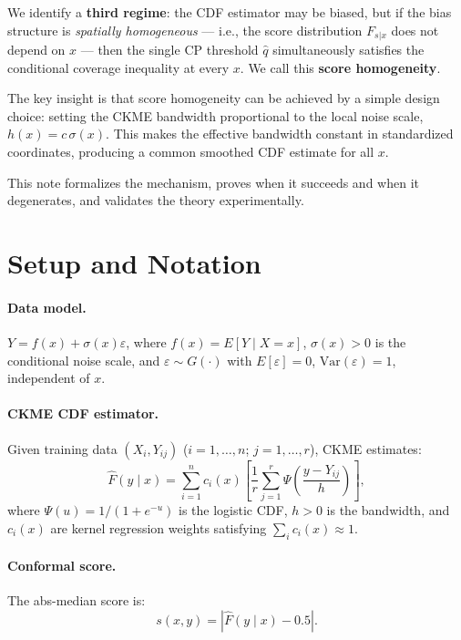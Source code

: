 \documentclass[11pt]{article}
\newif\ifpaper
\theoremstyle{remark}
\begin{document}
We identify a \textbf{third regime}: the CDF estimator may be biased,
but if the bias structure is \emph{spatially homogeneous} --- i.e., the
score distribution $F_{s|x}$ does not depend on $x$ --- then the single
CP threshold $\hat{q}$ simultaneously satisfies the conditional
coverage inequality at every $x$. We call this \textbf{score
homogeneity}.

The key insight is that score homogeneity can be achieved by a simple
design choice: setting the CKME bandwidth proportional to the local
noise scale, $h(x) = c\,\sigma(x)$. This makes the effective bandwidth
constant in standardized coordinates, producing a common smoothed CDF
estimate for all $x$.

This note formalizes the mechanism, proves when it succeeds and when it
degenerates, and validates the theory experimentally.
\fi %


\section{Setup and Notation}
\label{sec:notation}

\paragraph{Data model.}
$Y = f(x) + \sigma(x)\varepsilon$, where $f(x) = E[Y \mid X = x]$,
$\sigma(x) > 0$ is the conditional noise scale, and
$\varepsilon \sim G(\cdot)$ with $E[\varepsilon] = 0$,
$\mathrm{Var}(\varepsilon) = 1$, independent of $x$.

\paragraph{CKME CDF estimator.}
Given training data $(X_i, Y_{ij})$ ($i = 1,\ldots,n$;
$j = 1,\ldots,r$), CKME estimates:
\begin{equation}
\label{eq:ckme-cdf}
  \hat{F}(y \mid x) = \sum_{i=1}^{n} c_i(x) \left[
    \frac{1}{r} \sum_{j=1}^{r} \Psi\!\left(\frac{y - Y_{ij}}{h}\right)
  \right],
\end{equation}
where $\Psi(u) = 1/(1+e^{-u})$ is the logistic CDF,
$h > 0$ is the bandwidth, and $c_i(x)$ are kernel regression weights
satisfying $\sum_i c_i(x) \approx 1$.

\paragraph{Conformal score.}
The abs-median score is:
\begin{equation}
\label{eq:score}
  s(x, y) = |\hat{F}(y \mid x) - 0.5|.
\end{equation}
\end{document}
